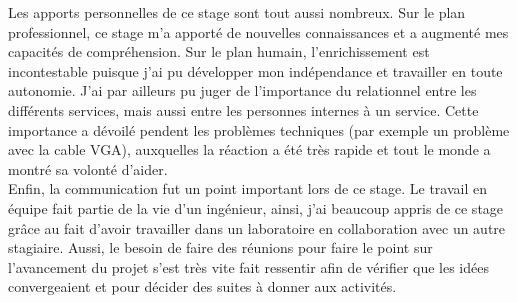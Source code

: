 Les apports personnelles de ce stage sont tout aussi nombreux. Sur le plan professionnel, ce stage m’a apporté de nouvelles connaissances et a augmenté mes capacités de compréhension. Sur le plan humain, l’enrichissement est incontestable puisque j’ai pu développer mon indépendance et travailler en toute autonomie. J’ai par ailleurs pu juger de l’importance du relationnel entre les différents services, mais aussi entre les personnes internes à un service. Cette importance a dévoilé pendent les problèmes techniques (par exemple un problème avec la cable VGA), auxquelles la réaction a été très rapide et tout le monde a montré sa volonté d'aider.\\

Enfin, la communication fut un point important lors de ce stage. Le travail en équipe fait partie de la vie d’un ingénieur, ainsi, j’ai beaucoup appris de ce stage grâce au fait d’avoir travailler dans un laboratoire en collaboration avec un autre stagiaire. Aussi, le besoin de faire
des réunions pour faire le point sur l’avancement du projet s’est très vite fait ressentir afin de vérifier que les idées convergeaient et pour décider des suites à donner aux activités.

